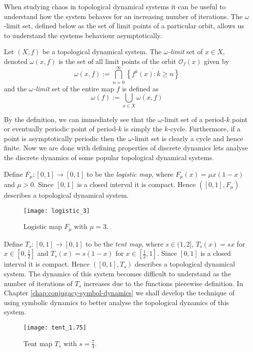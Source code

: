 When studying chaos in topological dynamical systems it can be useful to understand how the system behaves for an increasing number of iterations. The $\omega$-limit set, defined below as the set of limit points of a particular orbit, allows us to understand the systems behaviour asymptotically.

\begin{defn} \label{defn:omega-limit-set}
    Let $(X, f)$ be a topological dynamical system. The $\omega$\emph{-limit} set of $x \in X$, denoted $\omega(x, f)$ is the set of all limit points of the orbit $\mathcal{O}_f(x)$ given by \[\omega(x, f) := \bigcap_{n=0}^\infty\overline{\left\lbrace f^k(x) : k \geq n \right\rbrace}\] and the $\omega$\emph{-limit} set of the entire map $f$ is defined as \[\omega(f) := \bigcup_{x \in X} \omega(x, f)\]
\end{defn}

By the definition, we can immediately see that the $\omega$-limit set of a period-$k$ point or eventually periodic point of period-$k$ is simply the $k$-cycle. Furthermore, if a point is asymptotically periodic then the $\omega$-limit set is clearly a cycle and hence finite. Now we are done with defining properties of discrete dynamics lets analyse the discrete dynamics of some popular topological dynamical systems.

\begin{exmp} \label{exmp:logitic-map}
    Define $F_{\mu}: [0, 1] \to [0, 1]$ to be the \emph{logistic map}, where $F_{\mu}(x)=\mu x(1-x)$ and $\mu > 0$. Since $[0, 1]$ is a closed interval it is compact. Hence $([0, 1], F_{\mu})$ describes a topological dynamical system.

    \begin{figure}[h]
        \centering
        \texttt{[image: logistic\_3]}
        \caption{Logistic map $F_\mu$ with $\mu = 3$.}
        \label{fig:logistic_3}
    \end{figure}
\end{exmp}

\begin{exmp} \label{exmp:tent-map}
    Define $T_s: [0, 1] \to [0,1]$ to be the \emph{tent map}, where $s \in (1, 2]$, $T_s(x) = sx$ for $x \in \left[0, \frac{1}{2}\right]$ and $T_s(x) = s(1-x)$ for $x \in \left[\frac{1}{2}, 1\right]$. Since $[0, 1]$ is a closed interval it is compact. Hence $([0, 1], T_s)$ describes a topological dynamical system. The dynamics of this system becomes difficult to understand as the number of iterations of $T_s$ increases due to the functions piecewise definition. In Chapter \ref{chap:conjugacy-symbol-dynamics} we shall develop the technique of using symbolic dynamics to better analyse the topological dynamics of this system.

    \begin{figure}[h]
        \centering
        \texttt{[image: tent\_1.75]}
        \caption{Tent map $T_s$ with $s = \frac{7}{4}$.}
        \label{fig:tent_1.75}
    \end{figure}
\end{exmp}

